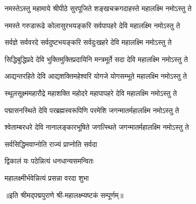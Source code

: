 
\twolineshloka
{नमस्तेऽस्तु महामाये श्रीपीठे सुरपूजिते}
{शङ्खचक्रगदाहस्ते महालक्ष्मि नमोऽस्तु ते}

\twolineshloka
{नमस्ते गरुडारूढे कोलासुरभयङ्करि}
{सर्वपापहरे देवि महालक्ष्मि नमोऽस्तु ते}

\twolineshloka
{सर्वज्ञे सर्ववरदे सर्वदुष्टभयङ्करि}
{सर्वदुःखहरे देवि महालक्ष्मि नमोऽस्तु ते}

\twolineshloka
{सिद्धिबुद्धिप्रदे देवि भुक्तिमुक्तिप्रदायिनि}
{मन्त्रमूर्ते सदा देवि महालक्ष्मि नमोऽस्तु ते}

\twolineshloka
{आद्यन्तरहिते देवि आद्यशक्तिमहेश्वरि}
{योगजे योगसम्भूते महालक्ष्मि नमोऽस्तु ते}

\twolineshloka
{स्थूलसूक्ष्ममहारौद्रे महाशक्ति महोदरे}
{महापापहरे देवि महालक्ष्मि नमोऽस्तु ते}

\twolineshloka
{पद्मासनस्थिते देवि परब्रह्मस्वरूपिणि}
{परमेशि जगन्मातर्महालक्ष्मि नमोऽस्तु ते}

\twolineshloka
{श्वेताम्बरधरे देवि नानालङ्कारभूषिते}
{जगत्स्थिते जगन्मातर्महालक्ष्मि नमोऽस्तु ते}

{सर्वसिद्धिमवाप्नोति राज्यं प्राप्नोति सर्वदा}

{द्विकालं यः पठेन्नित्यं धनधान्यसमन्वितः}

{महालक्ष्मीर्भवेन्नित्यं प्रसन्ना वरदा शुभा}

॥इति श्रीमद्पद्मपुराणे श्री-महालक्ष्म्यष्टकं सम्पूर्णम्॥